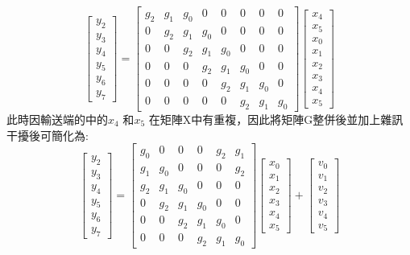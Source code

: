 \documentclass[12pt,a4paper]{article} %
\begin{document}
\[
\begin{bmatrix}
y_2 \\
y_3 \\
y_4 \\
y_5 \\
y_6 \\
y_7
\end{bmatrix}
=
\begin{bmatrix}
g_2 & g_1 & g_0 & 0 & 0 & 0 & 0 & 0 \\
0 & g_2 & g_1 & g_0 & 0 & 0 & 0 & 0 \\
0 & 0 & g_2 & g_1 & g_0 & 0 & 0 & 0 \\
0 & 0 & 0 & g_2 & g_1 & g_0 & 0 & 0 \\
0 & 0 & 0 & 0 & g_2 & g_1 & g_0 & 0 \\
0 & 0 & 0 & 0 & 0 & g_2 & g_1 & g_0
\end{bmatrix}
\begin{bmatrix}
x_4 \\
x_5 \\
x_0 \\
x_1 \\
x_2 \\
x_3 \\
x_4 \\
x_5
\end{bmatrix}
\]
此時因輸送端的中的$x_4$ 和$x_5$ 在矩陣X中有重複，因此將矩陣G整併後並加上雜訊干擾後可簡化為:
\[
\begin{bmatrix}
y_2 \\
y_3 \\
y_4 \\
y_5 \\
y_6 \\
y_7
\end{bmatrix}
=
\begin{bmatrix}
g_0 & 0   & 0   & 0   & g_2 & g_1 \\
g_1 & g_0 & 0   & 0   & 0   & g_2 \\
g_2 & g_1 & g_0 & 0   & 0   & 0   \\
0   & g_2 & g_1 & g_0 & 0   & 0   \\
0   & 0   & g_2 & g_1 & g_0 & 0   \\
0   & 0   & 0   & g_2 & g_1 & g_0
\end{bmatrix}
\begin{bmatrix}
x_0 \\
x_1 \\
x_2 \\
x_3 \\
x_4 \\
x_5
\end{bmatrix}
+
\begin{bmatrix}
v_0 \\
v_1 \\
v_2 \\
v_3 \\
v_4 \\
v_5
\end{bmatrix}
\]
\end{document}

